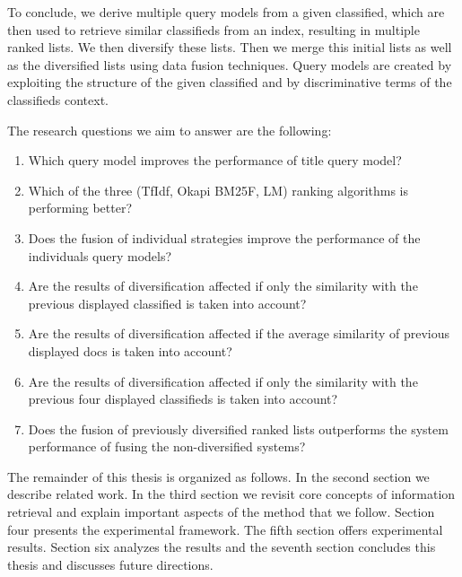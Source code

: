 To conclude, we derive multiple query models from a given classified, which are then used to retrieve similar classifieds from an index, resulting in multiple ranked lists. We then diversify these lists. Then we merge this initial lists as well as the diversified lists using data fusion techniques. Query models are created by exploiting the structure of the given classified and by discriminative terms of the classifieds context.

The research questions we aim to answer are the following:
\begin{enumerate}
\item Which query model improves the performance of title query model?
\item Which of the three (TfIdf, Okapi BM25F, LM) ranking algorithms is performing better?
\item Does the fusion of individual strategies improve the performance of the individuals query models?
\item Are the results of diversification affected if only the similarity with the previous displayed classified is taken into account?
\item Are the results of diversification affected if the average similarity of previous displayed docs is taken into account?
\item Are the results of diversification affected if only the similarity with the previous four displayed classifieds is taken into account?
\item Does the fusion of previously diversified ranked lists outperforms the system performance of fusing the non-diversified systems?
\end{enumerate}

The remainder of this thesis is organized as follows. In the second section we describe related work. In the third section we revisit core concepts of information retrieval and explain important aspects of the method that we follow. Section four presents the experimental framework. The fifth section offers experimental results. Section six analyzes the results and the seventh section concludes this thesis and discusses future directions.




